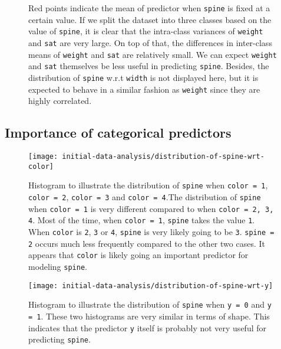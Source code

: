 \documentclass[a4paper, 12pt]{article}
\begin{document}
\begin{figure}
    \centering
    \qquad
    \caption{Red points indicate the mean of predictor when \texttt{spine} is fixed at a certain value. If we split the dataset into three classes based on the value of \texttt{spine}, it is clear that the intra-class variances of \texttt{weight} and \texttt{sat} are very large. On top of that, the differences in inter-class means of \texttt{weight} and \texttt{sat} are relatively small. We can expect \texttt{weight} and \texttt{sat} themselves be less useful in predicting \texttt{spine}. Besides, the distribution of \texttt{spine} w.r.t \texttt{width} is not displayed here, but it is expected to behave in a similar fashion as \texttt{weight} since they are highly correlated.}
    \label{distribution-of-spine-wrt-weight-sat}
\end{figure}




\subsection{Importance of categorical predictors}
\begin{figure}[H]
\begin{center}
\texttt{[image: initial-data-analysis/distribution-of-spine-wrt-color]}
\caption{Histogram to illustrate the distribution of \texttt{spine} when \texttt{color = 1}, \texttt{color = 2}, \texttt{color = 3} and \texttt{color = 4}.The distribution of \texttt{spine} when \texttt{color = 1} is very different compared to when \texttt{color = 2, 3, 4}. Most of the time, when \texttt{color = 1}, \texttt{spine} takes the value \texttt{1}. When \texttt{color} is \texttt{2}, \texttt{3} or \texttt{4}, \texttt{spine} is very likely going to be \texttt{3}. \texttt{spine = 2} occurs much less frequently compared to the other two cases. It appears that \texttt{color} is likely going an important predictor for modeling \texttt{spine}.
}
\label{distribution-of-spine-wrt-color}
\end{center}
\end{figure}

\begin{figure}[H]
\begin{center}
\texttt{[image: initial-data-analysis/distribution-of-spine-wrt-y]}
\caption{Histogram to illustrate the distribution of \texttt{spine} when \texttt{y = 0} and \texttt{y = 1}. These two histograms are very similar in terms of shape. This indicates that the predictor \texttt{y} itself is probably not very useful for predicting \texttt{spine}.
}
\label{distribution-of-spine-wrt-y}
\end{center}
\end{figure}
\end{document}
